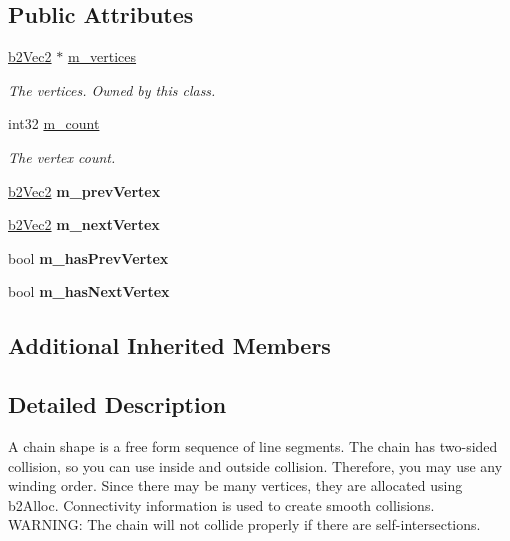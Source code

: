 \subsection*{Public Attributes}
\begin{DoxyCompactItemize}
\item 
\mbox{\label{classb2ChainShape_a481116a6886fb3880b13e55c966579da}} 
\mbox{\hyperlink{structb2Vec2}{b2\+Vec2}} $\ast$ \mbox{\hyperlink{classb2ChainShape_a481116a6886fb3880b13e55c966579da}{m\+\_\+vertices}}
\begin{DoxyCompactList}\small\item\em The vertices. Owned by this class. \end{DoxyCompactList}\item 
\mbox{\label{classb2ChainShape_ab2ad711781e6ac81179074e90e0e058b}} 
int32 \mbox{\hyperlink{classb2ChainShape_ab2ad711781e6ac81179074e90e0e058b}{m\+\_\+count}}
\begin{DoxyCompactList}\small\item\em The vertex count. \end{DoxyCompactList}\item 
\mbox{\label{classb2ChainShape_a3a42d4c6b2421bc5badda3b6164949cf}} 
\mbox{\hyperlink{structb2Vec2}{b2\+Vec2}} {\bfseries m\+\_\+prev\+Vertex}
\item 
\mbox{\label{classb2ChainShape_af3716ef780dd5bcd905e350d8854aaa2}} 
\mbox{\hyperlink{structb2Vec2}{b2\+Vec2}} {\bfseries m\+\_\+next\+Vertex}
\item 
\mbox{\label{classb2ChainShape_a8a6ffbb9de0e2b8545c8b4fc8aa77249}} 
bool {\bfseries m\+\_\+has\+Prev\+Vertex}
\item 
\mbox{\label{classb2ChainShape_a333b74486566e73c3cf1f7da5e69a96e}} 
bool {\bfseries m\+\_\+has\+Next\+Vertex}
\end{DoxyCompactItemize}
\subsection*{Additional Inherited Members}


\subsection{Detailed Description}
A chain shape is a free form sequence of line segments. The chain has two-\/sided collision, so you can use inside and outside collision. Therefore, you may use any winding order. Since there may be many vertices, they are allocated using b2\+Alloc. Connectivity information is used to create smooth collisions. W\+A\+R\+N\+I\+NG\+: The chain will not collide properly if there are self-\/intersections. 

